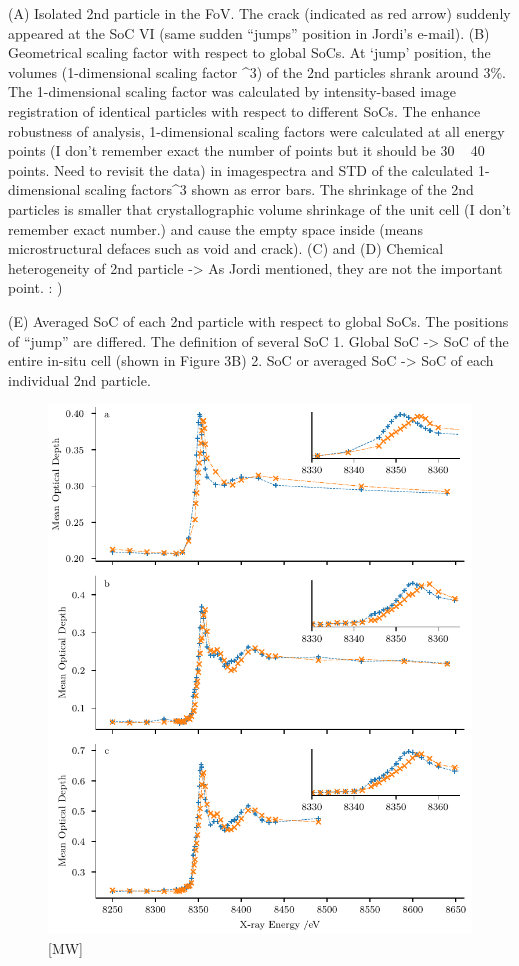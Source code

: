 \documentclass{article}
\begin{document}
(A) Isolated 2nd particle in the FoV. The crack (indicated as red
arrow) suddenly appeared at the SoC VI (same sudden ``jumps'' position
in Jordi's e-mail). (B) Geometrical scaling factor with respect to
global SoCs. At ‘jump’ position, the volumes (1-dimensional scaling
factor \textasciicircum3) of the 2nd particles shrank around 3\%. The 1-dimensional
scaling factor was calculated by intensity-based image registration of
identical particles with respect to different SoCs. The enhance
robustness of analysis, 1-dimensional scaling factors were calculated
at all energy points (I don't remember exact the number of points but
it should be 30 ~ 40 points. Need to revisit the data) in imagespectra
and STD of the calculated 1-dimensional scaling factors\^{}3 shown as
error bars.  The shrinkage of the 2nd particles is smaller that
crystallographic volume shrinkage of the unit cell (I don't remember
exact number.) and cause the empty space inside (means microstructural
defaces such as void and crack).  (C) and (D) Chemical heterogeneity
of 2nd particle -> As Jordi mentioned, they are not the important
point. : )

(E) Averaged SoC of each 2nd particle with respect to global
SoCs. The positions of ``jump'' are differed.  The definition of
several SoC 1. Global SoC -> SoC of the entire in-situ cell (shown
in Figure 3B) 2. SoC or averaged SoC -> SoC of each individual 2nd
particle.

\begin{figure}
  \includegraphics{figures/Kedges.pdf}
  \caption{[MW] }
  \label{fig:kedges}
\end{figure}
\end{document}
